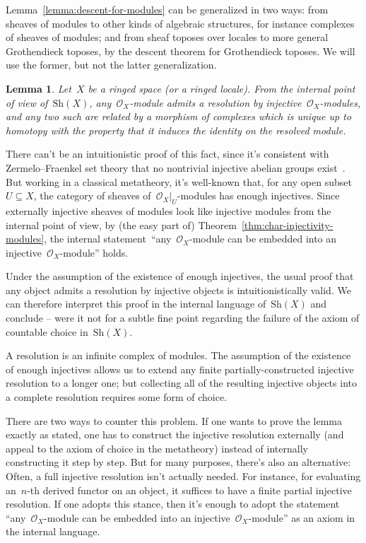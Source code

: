 \documentclass[10pt,reqno,a4paper]{amsbook}
\makeatletter
\theoremstyle{definition}
\theoremstyle{plain}
\newtheorem{lemma}[defn]{Lemma}
\theoremstyle{remark}
\renewcommand{\O}{\mathcal{O}}
\newcommand{\Sh}{\mathrm{Sh}}
\newcommand{\?}{\,{:}\,}
\renewcommand{\_}{\mathpunct{.}\,}
\renewenvironment{proof}[1][\proofname]{\par
  \pushQED{\qed}%
  \normalfont \topsep6\p@\@plus6\p@\relax
  \trivlist
  \item[\hskip\labelsep
        \itshape
    #1\@addpunct{.}]\ignorespaces
}{%
  \popQED\endtrivlist\@endpefalse
}
\makeatother
\begin{document}
Lemma~\ref{lemma:descent-for-modules} can be generalized in two
ways: from sheaves of modules to other kinds of algebraic structures, for
instance complexes of sheaves of modules; and from sheaf toposes over locales
to more general Grothendieck toposes, by the descent theorem for Grothendieck
toposes. We will use the former, but not the latter generalization.

\begin{lemma}\label{lemma:internal-resolutions}
Let~$X$ be a ringed space (or a ringed locale). From the internal point of view
of~$\Sh(X)$, any~$\O_X$-module admits a resolution by injective~$\O_X$-modules,
and any two such are related by a morphism of complexes which is unique up to
homotopy with the property that it induces the identity on the resolved module.
\end{lemma}

\begin{proof}There can't be an intuitionistic proof of this fact, since it's
consistent with Zermelo--Fraenkel set theory
that no nontrivial injective abelian groups exist~\cite{blass:inj-proj-axc}.
But working in a classical metatheory, it's well-known that, for any open
subset~$U \subseteq X$, the category of sheaves of~$\O_X|_U$-modules has enough
injectives. Since externally injective sheaves of modules look like injective
modules from the internal point of view, by (the easy part of)
Theorem~\ref{thm:char-injectivity-modules}, the internal
statement~``any~$\O_X$-module can be embedded into an injective~$\O_X$-module''
holds.

Under the assumption of the existence of enough injectives, the usual proof
that any object admits a resolution by injective objects is intuitionistically
valid. We can therefore interpret this proof in the internal language
of~$\Sh(X)$ and conclude -- were it not for a subtle fine point regarding the
failure of the axiom of countable choice in~$\Sh(X)$.

A resolution is an infinite complex of modules. The assumption of the existence
of enough injectives allows us to extend any finite partially-constructed
injective resolution to a longer one; but collecting all of the resulting
injective objects into a complete resolution requires some form of choice.

There are two ways to counter this problem. If one wants to prove the lemma
exactly as stated, one has to construct the injective resolution externally
(and appeal to the axiom of choice in the metatheory) instead of internally
constructing it step by step. But for many purposes, there's also an
alternative: Often, a full injective resolution isn't actually needed. For
instance, for evaluating an~$n$-th derived functor on an object, it suffices
to have a finite partial injective resolution. If one adopts this stance, then
it's enough to adopt the statement ``any~$\O_X$-module can be embedded into an
injective~$\O_X$-module'' as an axiom in the internal language.
\end{proof}
\end{document}
